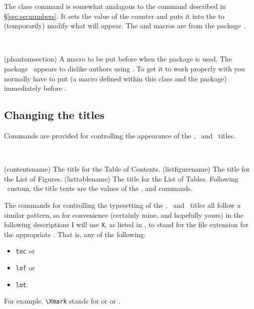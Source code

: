 The  class command \cmd{\settocdepth} is somewhat
analagous to the \cmd{\setsecnumdepth} command described in
\S\ref{sec:secnumbers}.  It sets the value of the 
counter and puts it into the \toc{} to (temporarily) modify what will
appear.  The \cmd{\settocdepth} and \cmd{\maxtocdepth} macros are from
the  package~\cite{TOCVSEC2}.


\begin{syntax}
 \\
\end{syntax}
\glossary(phantomsection)
  {}%
  {A macro to be put before  when the  
   package is used.}
\Note{} The  package~\cite{HYPERREF} appears to dislike 
authors using 
 \cmd{\addcontentsline}. To get it to work properly with 
 you normally have to put  (a macro defined within
this class and the  package) immediately 
 before \cmd{\addcontentsline}.

 \subsection{Changing the titles} \label{sec:titles}

    Commands are provided for controlling the appearance of the
\toc, \lof\ and \lot\ titles. 

\begin{syntax}
\cmd{\contentsname} \cmd{\listfigurename} \cmd{\listtablename} \\
\end{syntax}
\glossary(contentsname)%
  {}%
  {The title for the Table of Contents.}
\glossary(listfigurename)%
  {}%
  {The title for the List of Figures.}
\glossary(listtablename)%
  {}%
  {The title for the List of Tables.}
Following \ltx\ custom, the title texts are the values
of the \cmd{\contentsname}, \cmd{\listfigurename} and \cmd{\listtablename}
commands.

 The commands for controlling the typesetting of the \toc, \lof\ and \lot\ 
titles all follow a similar pattern, so for convenience (certainly mine, 
and hopefully yours) in the following descriptions I will use \texttt{X},
as listed in \tref{tab:Xlistofxtitles},
to stand for the file extension for the appropriate \listofx. That is, any
of the following:
\begin{itemize}
\item \texttt{toc} or
\item \texttt{lof} or
\item \texttt{lot}. 
\end{itemize}
For example, \verb?\Xmark? stands for \cmd{\tocmark} or \cmd{\lofmark} or 
\cmd{\lotmark}.

